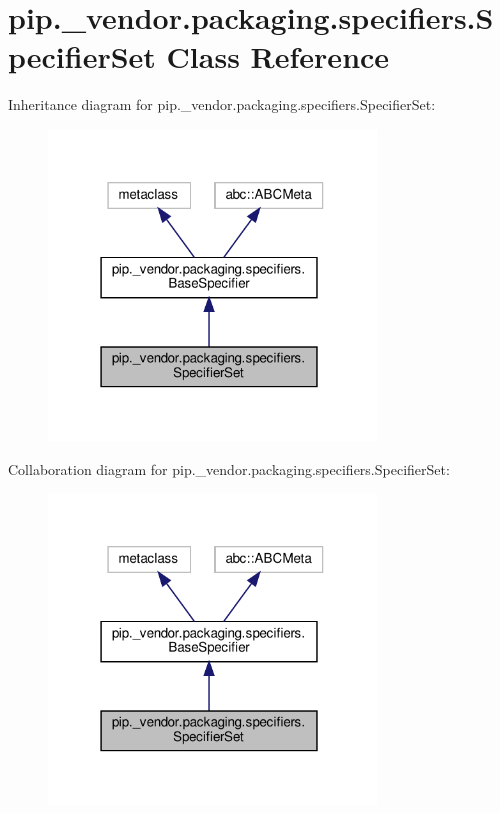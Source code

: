 \hypertarget{classpip_1_1__vendor_1_1packaging_1_1specifiers_1_1SpecifierSet}{}\section{pip.\+\_\+vendor.\+packaging.\+specifiers.\+Specifier\+Set Class Reference}
\label{classpip_1_1__vendor_1_1packaging_1_1specifiers_1_1SpecifierSet}


Inheritance diagram for pip.\+\_\+vendor.\+packaging.\+specifiers.\+Specifier\+Set\+:
\nopagebreak
\begin{figure}[H]
\begin{center}
\leavevmode
\includegraphics[width=247pt]{classpip_1_1__vendor_1_1packaging_1_1specifiers_1_1SpecifierSet__inherit__graph}
\end{center}
\end{figure}


Collaboration diagram for pip.\+\_\+vendor.\+packaging.\+specifiers.\+Specifier\+Set\+:
\nopagebreak
\begin{figure}[H]
\begin{center}
\leavevmode
\includegraphics[width=247pt]{classpip_1_1__vendor_1_1packaging_1_1specifiers_1_1SpecifierSet__coll__graph}
\end{center}
\end{figure}
